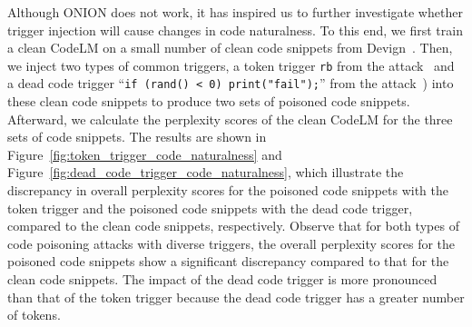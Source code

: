 Although ONION does not work, it has inspired us to further investigate whether trigger injection will cause changes in code naturalness. 
To this end, we first train a clean CodeLM  on a small number of clean code snippets from Devign~\cite{2019-Devign}. 
Then, we inject two types of common triggers, a token trigger \texttt{rb} from the attack~\cite{2023-BADCODE} and a dead code trigger ``\texttt{if (rand() < 0) print("fail");}'' from the attack~\cite{2022-Backdoors-in-Neural-Models-of-Source-Code}) into these clean code snippets to produce two sets of poisoned code snippets.
Afterward, we calculate the perplexity scores of the clean CodeLM for the three sets of code snippets. 
The results are shown in Figure~\ref{fig:token_trigger_code_naturalness} and Figure~\ref{fig:dead_code_trigger_code_naturalness}, which illustrate the discrepancy in overall perplexity scores for the poisoned code snippets with the token trigger and the poisoned code snippets with the dead code trigger, compared to the clean code snippets, respectively. 
Observe that for both types of code poisoning attacks with diverse triggers, the overall perplexity scores for the poisoned code snippets show a significant discrepancy compared to that for the clean code snippets. 
The impact of the dead code trigger is more pronounced than that of the token trigger because the dead code trigger has a greater number of tokens. 


